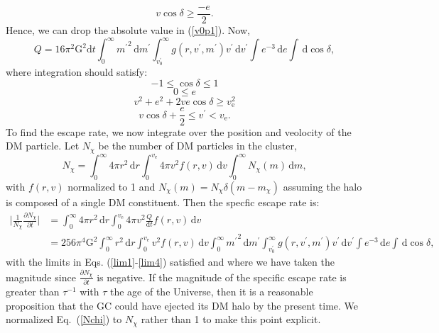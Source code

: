 \documentclass[aps,floatfix,prd,showpacs]{revtex4}
\newcommand{\diff}{\mathrm{d}}
\newcommand{\vesc}{v_{\text{e}}}
\newcommand{\vp}{v^\prime}
\newcommand{\mpr}{m^\prime}
\newcommand{\G}{\text{G}}
\newcommand{\mx}{m_\chi}
\newcommand{\Nx}{N_\chi}
\begin{document}
\begin{equation}
v\cos\delta \ge \frac{-e}{2}.
\end{equation}
%
%
Hence, we can drop the absolute value in (\ref{v0p1}).  Now,
%
\begin{equation}
Q = 16\pi^2\G^2\diff t\int^\infty_0{\mpr}^2\,\diff \mpr\int^\infty_{\vp_0}{g(r,\vp,\mpr)\vp}\,\diff \vp\int{e^{-3}}\,\diff e\int{}\,\diff \cos\delta,
\end{equation}
%
%
where integration should satisfy:
%
\begin{equation}
-1 \le \cos\delta \le 1
\label{lim1}
\end{equation}
\begin{equation}
0 \le e
\label{lim2}
\end{equation}
\begin{equation}
v^2 + e^2 + 2ve\cos\delta \ge \vesc^2
\label{lim3}
\end{equation}
\begin{equation}
v\cos\delta + \frac{e}{2} \le \vp < \vesc.
\label{lim4}
\end{equation}
%
%
To find the escape rate, we now integrate over the position and veolocity of the DM particle.  Let $\Nx$ be the number of DM particles in the cluster,  
%
\begin{equation}
\Nx = \int^\infty_0{4\pi r^2}\,\diff r\int^{\vesc}_0{4\pi v^2f(r,v)}\,\diff v\int^\infty_0{\Nx(m)}\,\diff m,
\label{Nchi}
\end{equation}
with $f(r,v)$ normalized to 1 and $\Nx(m) = \Nx\delta(m-\mx)$ assuming the halo is composed of a single DM constituent.  Then the specfic escape rate is:
%
\begin{equation}
\label{esc1}
\begin{split}
\bigg|\frac{1}{\Nx}\frac{\partial \Nx}{\partial t}\bigg| & = \int^\infty_0{4\pi r^2}\,\diff r\int^{\vesc}_0{4\pi v^2\frac{Q}{\diff t}f(r,v)}\,\diff v \\
& = 256\pi^4\G^2\int^\infty_0{r^2}\,\diff r\int^{\vesc}_0{v^2f(r,v)}\,\diff v\int^\infty_0{\mpr}^2\,\diff \mpr\int^\infty_{\vp_0}{g(r,\vp,\mpr)\vp}\,\diff \vp\int{e^{-3}}\,\diff e\int{}\,\diff\cos\delta,
\end{split}
\end{equation}
%
%
with the limits in Eqs. (\ref{lim1}-\ref{lim4}) satisfied and where we have taken the magnitude since $\frac{\partial \Nx}{\partial t}$ is negative.  If the magnitude of the specific escape rate is greater than $\tau^{-1}$ with $\tau$ the age of the Universe, then it is a reasonable proposition that the GC could have ejected its DM halo by the present time.  We normalized Eq.~(\ref{Nchi}) to $\Nx$ rather than 1 to make this point explicit.  
\end{document}
